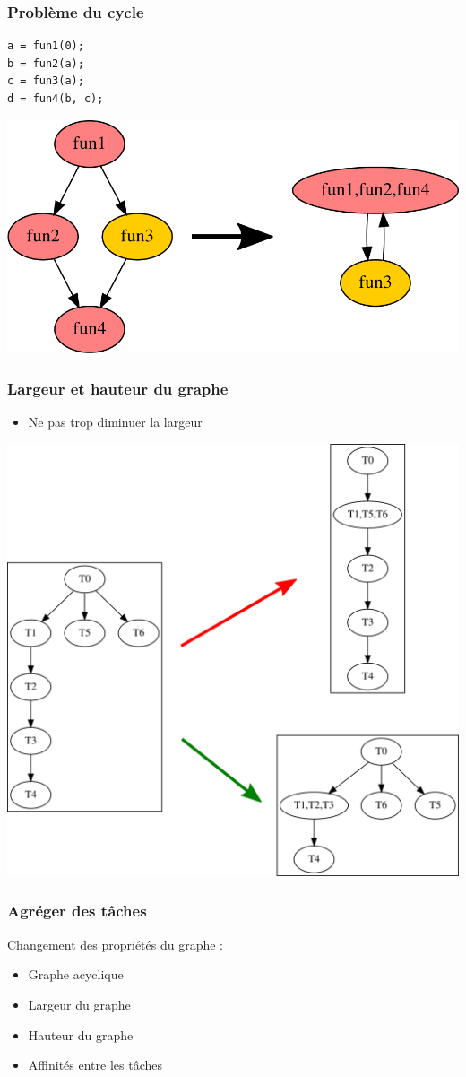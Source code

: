 \documentclass{beamer}
\begin{document}
\begin{frame}[fragile]
  \frametitle{Problème du cycle}

\begin{lstlisting}
a = fun1(0);
b = fun2(a);
c = fun3(a);
d = fun4(b, c);
\end{lstlisting}

  \centerline{\includegraphics[width=0.8\linewidth]{agg_invalid}}
\end{frame}


\begin{frame}
  \frametitle{Largeur et hauteur du graphe}

  \begin{itemize}
    \item Ne pas trop diminuer la largeur
  \end{itemize}

  \centerline{\includegraphics[width=0.6\linewidth]{agg_hl}}
\end{frame}


\begin{frame}
  \frametitle{Agréger des tâches}

  Changement des propriétés du graphe :
  \begin{itemize}
    \item Graphe acyclique
    \item Largeur du graphe
    \item Hauteur du graphe
    \item Affinités entre les tâches
  \end{itemize}

\end{frame}
\end{document}
